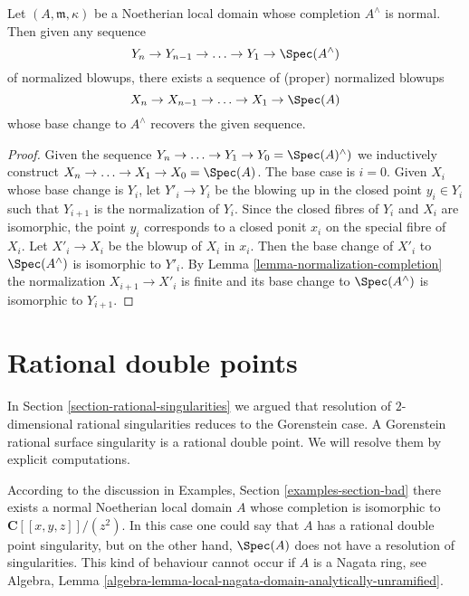 \begin{lemma}
\label{lemma-normalized-blowup-completion}
Let $(A, \mathfrak m, \kappa)$ be a Noetherian local domain whose completion
$A^\wedge$ is normal. Then given any sequence
$$
Y_n \to Y_{n - 1} \to \ldots \to Y_1 \to \Spec(A^\wedge)
$$
of normalized blowups, there exists a sequence of (proper) normalized blowups
$$
X_n \to X_{n - 1} \to \ldots \to X_1 \to \Spec(A)
$$
whose base change to $A^\wedge$ recovers the given sequence.
\end{lemma}

\begin{proof}
Given the sequence $Y_n \to \ldots \to Y_1 \to Y_0 = \Spec(A)^\wedge)$ we
inductively construct $X_n \to \ldots \to X_1 \to X_0 = \Spec(A)$.
The base case is $i = 0$. Given $X_i$ whose base change is $Y_i$,
let $Y'_i \to Y_i$ be the blowing up in the closed point $y_i \in Y_i$
such that $Y_{i + 1}$ is the normalization of $Y_i$.
Since the closed fibres of $Y_i$ and $X_i$ are isomorphic, the point
$y_i$ corresponds to a closed ponit $x_i$ on the special fibre of $X_i$.
Let $X'_i \to X_i$ be the blowup of $X_i$ in $x_i$. Then the base change
of $X'_i$ to $\Spec(A^\wedge)$ is isomorphic to $Y'_i$. 
By Lemma \ref{lemma-normalization-completion}
the normalization $X_{i + 1} \to X'_i$ is finite and its base change
to $\Spec(A^\wedge)$ is isomorphic to $Y_{i + 1}$.
\end{proof}














\section{Rational double points}
\label{section-rational-double-points}

\noindent
In Section \ref{section-rational-singularities}
we argued that resolution of $2$-dimensional
rational singularities reduces to the Gorenstein case.
A Gorenstein rational surface singularity is a rational double point.
We will resolve them by explicit computations.

\medskip\noindent
According to the discussion in Examples, Section \ref{examples-section-bad}
there exists a normal Noetherian local domain $A$ whose completion
is isomorphic to $\mathbf{C}[[x, y, z]]/(z^2)$. In this case one could
say that $A$ has a rational double point singularity, but on the other
hand, $\Spec(A)$ does not have a resolution of singularities.
This kind of behaviour cannot occur if $A$ is a Nagata ring, see
Algebra, Lemma \ref{algebra-lemma-local-nagata-domain-analytically-unramified}.

